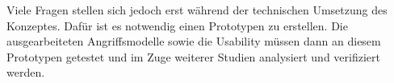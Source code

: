 \documentclass{sigchi}
\begin{document}
Viele Fragen stellen sich jedoch erst während der technischen Umsetzung des Konzeptes. Dafür ist es notwendig einen Prototypen zu erstellen. Die ausgearbeiteten Angriffsmodelle sowie die Usability müssen dann an diesem Prototypen getestet und im Zuge weiterer Studien analysiert und verifiziert werden.




\balance{}



\end{document}
